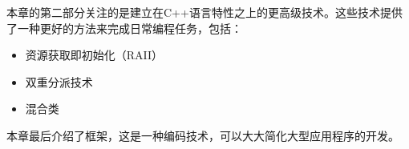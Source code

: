 本章的第二部分关注的是建立在C++语言特性之上的更高级技术。这些技术提供了一种更好的方法来完成日常编程任务，包括：

\begin{itemize}
\item
资源获取即初始化（RAII）

\item
双重分派技术

\item
混合类
\end{itemize}

本章最后介绍了框架，这是一种编码技术，可以大大简化大型应用程序的开发。
















